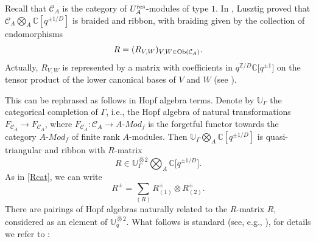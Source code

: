 \documentclass[10pt,a4paper]{amsart}
\numberwithin{equation}{section}
\theoremstyle{definition}
\newcommand{\mUq}{\mathbb{U}_q}
\newcommand{\mc}{\mathbb{C}}
\newcommand{\mz}{\mathbb{Z}}
\newcommand{\ra}{\rightarrow}
\begin{document}
Recall that $\mathcal{C}_A$ is the category of $U_A^{\rm res}$-modules of type $1$. In \cite{Lusztig2,Lusztig}, Lusztig proved that $\mathcal{C}_A\bigotimes_A \mc[q^{\pm 1/D}]$ is braided and ribbon, with braiding given by the collection of endomorphisms
\[R = (R_{V,W})_{V,W\in {\rm Ob}(\mathcal{C}_A)}.\]
Actually, $R_{V,W}$ is represented by a matrix with coefficients in $q^{\mz/D}\mc\big[q^{\pm 1}\big]$ on the tensor product of the lower canonical bases of $V$ and $W$ (see \cite[Corollary~24.1.5]{Lusztig}).

This can be rephrased as follows in Hopf algebra terms. Denote by $\mathbb{U}_{\Gamma}$ the categorical completion of $\Gamma$, i.e., the Hopf algebra of natural transformations $F_{\mathcal{C}_A} \ra F_{\mathcal{C}_A}$, where ${F_{\mathcal{C}_A}\colon \mathcal{C}_A\ra A}$-$Mod_f$ is the forgetful functor towards the category $A$-$Mod_f$ of finite rank $A$-modules. Then $\mathbb{U}_{\Gamma}\bigotimes_A \mc[q^{\pm 1/D}]$ is quasi-triangular and ribbon with $R$-matrix
\[R\in \mathbb{U}_{\Gamma}^{\hat{\otimes} 2}\bigotimes_A \mc\bigl[q^{\pm 1/D}\bigr].\]
As in \eqref{Rcat}, we can write
 \[R^\pm=\sum_{(R)}R^\pm_{(1)}\otimes R^\pm_{(2)}.\]
There are pairings of Hopf algebras naturally related to the $R$-matrix $R$, considered as an element of $\mUq^{\hat{\otimes} 2}$. What follows is standard (see, e.g., \cite{KhorTol,KirRes,LS}), for details we refer to \cite[Proposition~3.73, Lemma~3.75, Theorem~3.92, Propositions~3.106 and 3.107]{VY}:
\end{document}
